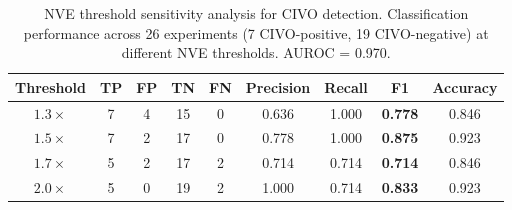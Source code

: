 
\begin{table}[t]
\centering
\caption{NVE threshold sensitivity analysis for CIVO detection. Classification performance across 26 experiments (7 CIVO-positive, 19 CIVO-negative) at different NVE thresholds. AUROC = 0.970.}
\label{tab:nve_threshold_sensitivity}
\begin{tabular}{ccccccccc}
\toprule
Threshold & TP & FP & TN & FN & Precision & Recall & F1 & Accuracy \\
\midrule
$1.3\times$ & 7 & 4 & 15 & 0 & 0.636 & 1.000 & \textbf{0.778} & 0.846 \\
$1.5\times$ & 7 & 2 & 17 & 0 & 0.778 & 1.000 & \textbf{0.875} & 0.923 \\
$1.7\times$ & 5 & 2 & 17 & 2 & 0.714 & 0.714 & \textbf{0.714} & 0.846 \\
$2.0\times$ & 5 & 0 & 19 & 2 & 1.000 & 0.714 & \textbf{0.833} & 0.923 \\
\bottomrule
\end{tabular}
\end{table}

